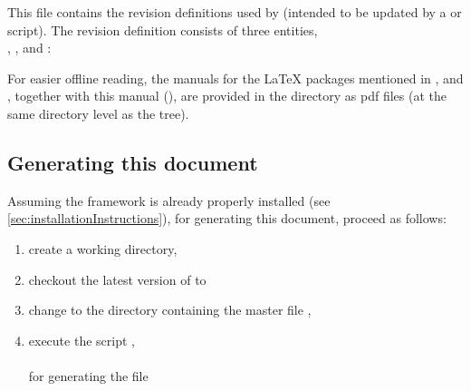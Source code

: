 \begin{description}
      This file contains the revision definitions used by \wegcLaTeX{}
      (intended to be updated by a  or  script).
      The revision definition consists of three entities, \IE{} \\
      ,
      , and
      :
      \begin{CommandLineListing}[print=true, gobble=6]
         \newcommand*{\documentMajorVersion}{5}
         \newcommand*{\documentMinorVersion}{6}
         \newcommand*{\documentRevision}{3072}
      \end{CommandLineListing}
\end{description}

For easier offline reading, the manuals for the \LaTeX{} packages mentioned
in ,  and
, together with this manual
(), are provided in the directory  as
\ac{pdf} files (at the same directory level as the \wegcLaTeX{} \texmf{}
tree).



\subsection{Generating this document}
\label{subsec:generatingThisDocument}

Assuming the \wegcLaTeX{} framework is already properly installed (see \autoref{sec:installationInstructions}),
for generating this document, proceed as follows:
\begin{enumerate}
   \item
      create a working directory, \EG{} 
   \item
      checkout the latest version of \wegcLaTeX{} to 
   \item
      change to the directory containing the master file , \IE{} \\
   \item
      execute the script , \IE{} \\
       \\
      for generating the  file 
\end{enumerate}
